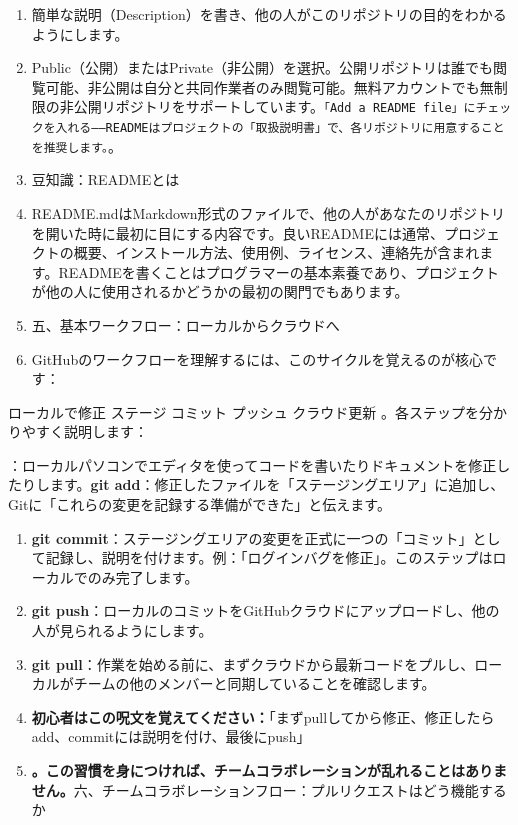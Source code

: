 \begin{enumerate}
  \item 簡単な説明（Description）を書き、他の人がこのリポジトリの目的をわかるようにします。
  \item Public（公開）またはPrivate（非公開）を選択。公開リポジトリは誰でも閲覧可能、非公開は自分と共同作業者のみ閲覧可能。無料アカウントでも無制限の非公開リポジトリをサポートしています。\texttt{「Add a README file」にチェックを入れる——READMEはプロジェクトの「取扱説明書」で、各リポジトリに用意することを推奨します。}。
  \item 豆知識：READMEとは
  \item README.mdはMarkdown形式のファイルで、他の人があなたのリポジトリを開いた時に最初に目にする内容です。良いREADMEには通常、プロジェクトの概要、インストール方法、使用例、ライセンス、連絡先が含まれます。READMEを書くことはプログラマーの基本素養であり、プロジェクトが他の人に使用されるかどうかの最初の関門でもあります。
  \item 五、基本ワークフロー：ローカルからクラウドへ
  \item GitHubのワークフローを理解するには、このサイクルを覚えるのが核心です：
\end{enumerate}

\begin{tcbinfo}{ローカルで修正 ステージ コミット プッシュ クラウド更新}
。各ステップを分かりやすく説明します：

\end{tcbinfo}


：ローカルパソコンでエディタを使ってコードを書いたりドキュメントを修正したりします。\textbf{git add}：修正したファイルを「ステージングエリア」に追加し、Gitに「これらの変更を記録する準備ができた」と伝えます。

\begin{enumerate}
  \item \textbf{git commit}：ステージングエリアの変更を正式に一つの「コミット」として記録し、説明を付けます。例：「ログインバグを修正」。このステップはローカルでのみ完了します。
  \item \textbf{git push}：ローカルのコミットをGitHubクラウドにアップロードし、他の人が見られるようにします。
  \item \textbf{git pull}：作業を始める前に、まずクラウドから最新コードをプルし、ローカルがチームの他のメンバーと同期していることを確認します。
  \item \textbf{初心者はこの呪文を覚えてください：}「まずpullしてから修正、修正したらadd、commitには説明を付け、最後にpush」
  \item \textbf{。この習慣を身につければ、チームコラボレーションが乱れることはありません。}六、チームコラボレーションフロー：プルリクエストはどう機能するか
\end{enumerate}

